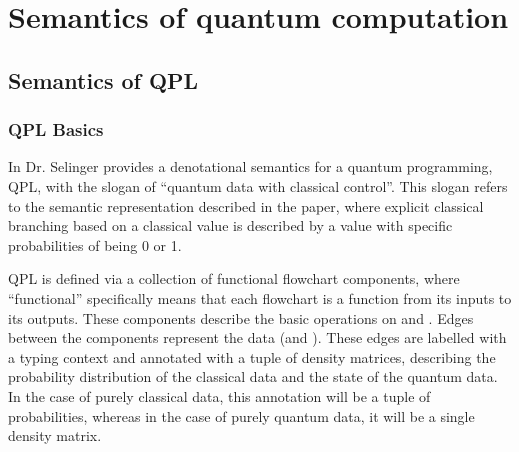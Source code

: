 \section{Semantics of quantum computation}%
\label{sec:semanticsquantum}
\subsection{Semantics of QPL}\label{sec:semanticsqpl}
\subsubsection{QPL Basics}\label{sec:qplbasics}
In \cite{selinger04:qpl} Dr. Selinger provides a denotational semantics for a quantum programming,
QPL, with the slogan of ``quantum data with classical control''. This slogan refers to the semantic
representation described in the paper, where explicit classical branching based on a classical
value is described by a \bit value with specific probabilities of being 0 or 1.

QPL is defined via a collection of functional flowchart components, where ``functional''
specifically means that each flowchart is a function from its inputs to its outputs. These
components describe the basic operations on \bits and \qbits. Edges between the components
represent the data (\bits and \qbits). These edges are labelled with a typing context and annotated
with a tuple of density matrices, describing the probability distribution of the classical data and
the state of the quantum data. In the case of purely classical data, this annotation will be a
tuple of probabilities, whereas in the case of purely quantum data, it will be a single density
matrix.

